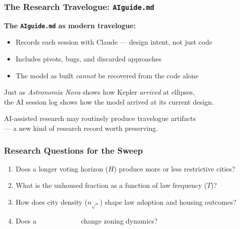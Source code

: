 \documentclass{beamer}
\begin{document}
\begin{frame}
  \frametitle{The Research Travelogue: \texttt{AIguide.md}}
  \textcolor{nimbygreen}{\textbf{The \texttt{AIguide.md} as modern travelogue:}}
  \begin{itemize}
    \item Records each session with Claude — design intent, not just code
    \item Includes pivots, bugs, and discarded approaches
    \item The model as built \emph{cannot} be recovered from the code alone
  \end{itemize}
  \vspace{0.6em}
  \textcolor{nimbygray}{\small Just as \textit{Astronomia Nova} shows how Kepler \emph{arrived} at ellipses,\\
  the AI session log shows how the model arrived at its current design.}
  \vspace{0.5em}
  \begin{center}
    \textcolor{nimbyblue}{AI-assisted research may routinely produce travelogue artifacts\\
    — a new kind of research record worth preserving.}
  \end{center}
\end{frame}


\begin{frame}
  \frametitle{Research Questions for the Sweep}
  \begin{enumerate}
    \item Does a \textcolor{nimbyblue}{longer voting horizon} ($H$) produce more or less restrictive cities?
    \item What is the \textcolor{nimbyyellow}{unhoused fraction} as a function of law frequency ($T$)?
    \item How does \textcolor{nimbygreen}{city density} ($n_{\sqrt{\phantom{x}}}$) shape law adoption and housing outcomes?
    \item Does a \textcolor{white}{road network} change zoning dynamics?
  \end{enumerate}
\end{frame}
\end{document}
